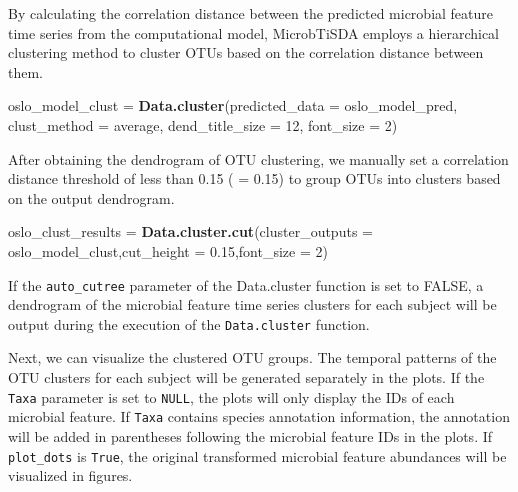 \documentclass[
]{article}
\newenvironment{Shaded}{\begin{snugshade}}{\end{snugshade}}
\newcommand{\AttributeTok}[1]{\textcolor[rgb]{0.13,0.29,0.53}{#1}}
\newcommand{\DecValTok}[1]{\textcolor[rgb]{0.00,0.00,0.81}{#1}}
\newcommand{\FloatTok}[1]{\textcolor[rgb]{0.00,0.00,0.81}{#1}}
\newcommand{\FunctionTok}[1]{\textcolor[rgb]{0.13,0.29,0.53}{\textbf{#1}}}
\newcommand{\NormalTok}[1]{#1}
\newcommand{\OtherTok}[1]{\textcolor[rgb]{0.56,0.35,0.01}{#1}}
\newcommand{\StringTok}[1]{\textcolor[rgb]{0.31,0.60,0.02}{#1}}
\begin{document}
By calculating the correlation distance between the predicted microbial
feature time series from the computational model, MicrobTiSDA employs a
hierarchical clustering method to cluster OTUs based on the correlation
distance between them.

\begin{Shaded}
\begin{Highlighting}[]
\NormalTok{oslo\_model\_clust }\OtherTok{=} \FunctionTok{Data.cluster}\NormalTok{(}\AttributeTok{predicted\_data =}\NormalTok{ oslo\_model\_pred,}
                                \AttributeTok{clust\_method =} \StringTok{\textquotesingle{}average\textquotesingle{}}\NormalTok{,}
                                \AttributeTok{dend\_title\_size =} \DecValTok{12}\NormalTok{,}
                                \AttributeTok{font\_size =} \DecValTok{2}\NormalTok{)}
\end{Highlighting}
\end{Shaded}

After obtaining the dendrogram of OTU clustering, we manually set a
correlation distance threshold of less than 0.15 ( =
0.15) to group OTUs into clusters based on the output dendrogram.

\begin{Shaded}
\begin{Highlighting}[]
\NormalTok{oslo\_clust\_results }\OtherTok{=} \FunctionTok{Data.cluster.cut}\NormalTok{(}\AttributeTok{cluster\_outputs =}\NormalTok{ oslo\_model\_clust,}\AttributeTok{cut\_height =} \FloatTok{0.15}\NormalTok{,}\AttributeTok{font\_size =} \DecValTok{2}\NormalTok{)}
\end{Highlighting}
\end{Shaded}

If the \texttt{auto\_cutree} parameter of the Data.cluster function is
set to FALSE, a dendrogram of the microbial feature time series clusters
for each subject will be output during the execution of the
\texttt{Data.cluster} function.

Next, we can visualize the clustered OTU groups. The temporal patterns
of the OTU clusters for each subject will be generated separately in the
plots. If the \texttt{Taxa} parameter is set to \texttt{NULL}, the plots
will only display the IDs of each microbial feature. If \texttt{Taxa}
contains species annotation information, the annotation will be added in
parentheses following the microbial feature IDs in the plots. If
\texttt{plot\_dots} is \texttt{True}, the original transformed microbial
feature abundances will be visualized in figures.
\end{document}
